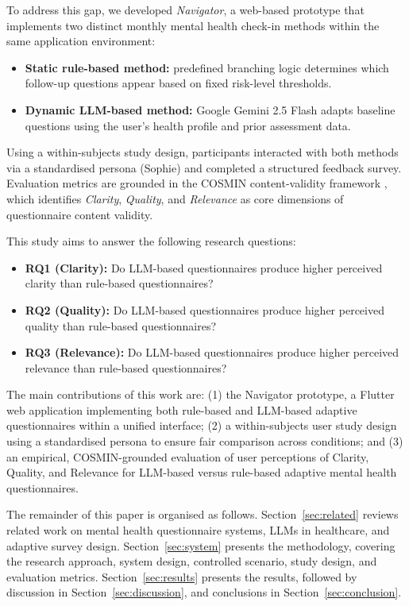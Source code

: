 \documentclass[conference]{IEEEtran}
\begin{document}
To address this gap, we developed \emph{Navigator}, a web-based prototype that
implements two distinct monthly mental health check-in methods within the same
application environment:
\begin{itemize}
  \item \textbf{Static rule-based method:} predefined branching logic determines
        which follow-up questions appear based on fixed risk-level thresholds.
  \item \textbf{Dynamic LLM-based method:} Google Gemini 2.5 Flash adapts
        baseline questions using the user's health profile and prior assessment data.
\end{itemize}
Using a within-subjects study design, participants interacted with both methods via a
standardised persona (Sophie) and completed a structured feedback survey. Evaluation
metrics are grounded in the COSMIN content-validity framework \cite{terwee2018},
which identifies \emph{Clarity}, \emph{Quality}, and \emph{Relevance} as core
dimensions of questionnaire content validity.

This study aims to answer the following research questions:
\begin{itemize}
  \item \textbf{RQ1 (Clarity):} Do LLM-based questionnaires produce higher perceived
        clarity than rule-based questionnaires?
  \item \textbf{RQ2 (Quality):} Do LLM-based questionnaires produce higher perceived
        quality than rule-based questionnaires?
  \item \textbf{RQ3 (Relevance):} Do LLM-based questionnaires produce higher perceived
        relevance than rule-based questionnaires?
\end{itemize}

The main contributions of this work are:
(1) the Navigator prototype, a Flutter web application implementing both rule-based
and LLM-based adaptive questionnaires within a unified interface;
(2) a within-subjects user study design using a standardised persona to ensure fair
comparison across conditions; and
(3) an empirical, COSMIN-grounded evaluation of user perceptions of Clarity, Quality,
and Relevance for LLM-based versus rule-based adaptive mental health questionnaires.

The remainder of this paper is organised as follows.
Section~\ref{sec:related} reviews related work on mental health questionnaire systems,
LLMs in healthcare, and adaptive survey design.
Section~\ref{sec:system} presents the methodology, covering the research
approach, system design, controlled scenario, study design, and
evaluation metrics.
Section~\ref{sec:results} presents the results, followed by discussion in
Section~\ref{sec:discussion}, and conclusions in Section~\ref{sec:conclusion}.
\end{document}
